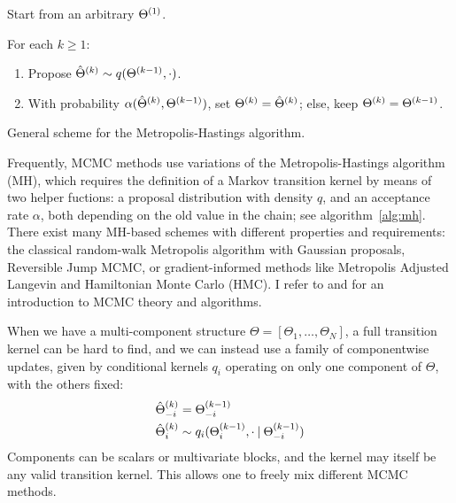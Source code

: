 \begin{algorithm}
  \begin{myalgorithmic}
  \item Start from an arbitrary \(\kth[1]{\Theta}\).
  \item For each \(k \ge 1\):
    \begin{enumerate}
    \item Propose \(\kth[k]{\hat{\Theta}} \from q(\kth[k-1]{\Theta}, \cdot)\).
    \item With probability \(\alpha(\kth[k]{\hat{\Theta}}, \kth[k-1]{\Theta})\), set
      \(\kth[k]{\Theta} = \kth[k]{\hat{\Theta}}\); else, keep \(\kth[k]{\Theta} = \kth[k-1]{\Theta}\).
    \end{enumerate}
  \end{myalgorithmic}
  \caption{General scheme for the Metropolis-Hastings algorithm.\label{alg:mh}}
\end{algorithm}
Frequently, MCMC methods use variations of the Metropolis-Hastings algorithm (MH), which requires
the definition of a Markov transition kernel by means of two helper fuctions: a proposal
distribution with density \(q\), and an acceptance rate \(\alpha\), both depending on the old value
in the chain; see algorithm~\ref{alg:mh}. There exist many MH-based
schemes with different properties and requirements: the classical random-walk Metropolis algorithm
with Gaussian proposals, Reversible Jump MCMC, or gradient-informed methods like Metropolis Adjusted
Langevin and Hamiltonian Monte Carlo (HMC).  I refer to \textcite[chapter 6]{vihola2020lectures} and
\textcite[chapters 24 and following]{murphy2012machine} for an introduction to MCMC theory and
algorithms.

When we have a multi-component structure \(\Theta = [\Theta_1, \ldots, \Theta_N]\), a full
transition kernel can be hard to find, and we can instead use a family of componentwise updates,
given by conditional kernels \(q_{i}\) operating on only one component of \(\Theta\), with the
others fixed:
\begin{equation}
  \label{eq:conditional-kernels}
  \begin{aligned}
    \kth[k]{\hat{\Theta}}_{-i} &= \kth[k-1]{\Theta}_{-i} \\
    \kth[k]{\hat{\Theta}}_{i} &\from q_{i}(\kth[k-1]{\Theta}_{i}, \cdot \given \kth[k-1]{\Theta}_{-i})
  \end{aligned}
\end{equation}
Components can be scalars or multivariate blocks, and the kernel may itself be any valid transition
kernel.  This allows one to freely mix different MCMC methods.

